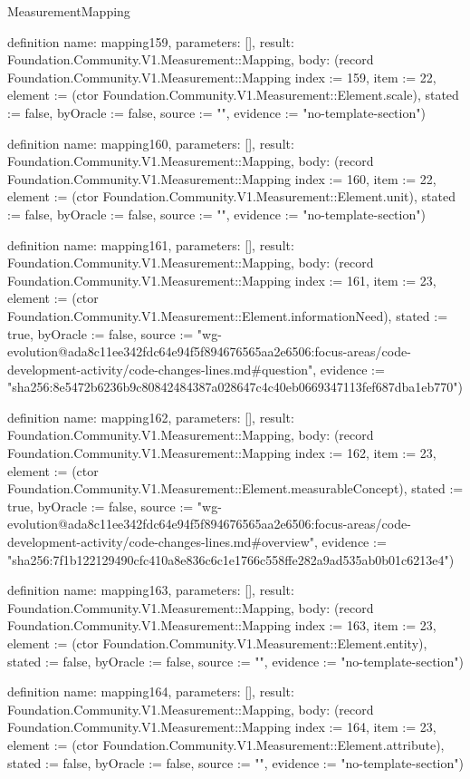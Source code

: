 \begin{lexlean}{MeasurementMapping}
\begin{semanticmodule}
definition{
  name: mapping159,
  parameters: [],
  result: Foundation.Community.V1.Measurement::Mapping,
  body: (record Foundation.Community.V1.Measurement::Mapping {index := 159, item := 22, element := (ctor Foundation.Community.V1.Measurement::Element.scale), stated := false, byOracle := false, source := "", evidence := "no-template-section"})
}

definition{
  name: mapping160,
  parameters: [],
  result: Foundation.Community.V1.Measurement::Mapping,
  body: (record Foundation.Community.V1.Measurement::Mapping {index := 160, item := 22, element := (ctor Foundation.Community.V1.Measurement::Element.unit), stated := false, byOracle := false, source := "", evidence := "no-template-section"})
}

definition{
  name: mapping161,
  parameters: [],
  result: Foundation.Community.V1.Measurement::Mapping,
  body: (record Foundation.Community.V1.Measurement::Mapping {index := 161, item := 23, element := (ctor Foundation.Community.V1.Measurement::Element.informationNeed), stated := true, byOracle := false, source := "wg-evolution@ada8c11ee342fdc64e94f5f894676565aa2e6506:focus-areas/code-development-activity/code-changes-lines.md#question", evidence := "sha256:8e5472b6236b9c80842484387a028647c4c40eb0669347113fef687dba1eb770"})
}

definition{
  name: mapping162,
  parameters: [],
  result: Foundation.Community.V1.Measurement::Mapping,
  body: (record Foundation.Community.V1.Measurement::Mapping {index := 162, item := 23, element := (ctor Foundation.Community.V1.Measurement::Element.measurableConcept), stated := true, byOracle := false, source := "wg-evolution@ada8c11ee342fdc64e94f5f894676565aa2e6506:focus-areas/code-development-activity/code-changes-lines.md#overview", evidence := "sha256:7f1b122129490cfc410a8e836c6c1e1766c558ffe282a9ad535ab0b01c6213e4"})
}

definition{
  name: mapping163,
  parameters: [],
  result: Foundation.Community.V1.Measurement::Mapping,
  body: (record Foundation.Community.V1.Measurement::Mapping {index := 163, item := 23, element := (ctor Foundation.Community.V1.Measurement::Element.entity), stated := false, byOracle := false, source := "", evidence := "no-template-section"})
}

definition{
  name: mapping164,
  parameters: [],
  result: Foundation.Community.V1.Measurement::Mapping,
  body: (record Foundation.Community.V1.Measurement::Mapping {index := 164, item := 23, element := (ctor Foundation.Community.V1.Measurement::Element.attribute), stated := false, byOracle := false, source := "", evidence := "no-template-section"})
}


\end{semanticmodule}
\end{lexlean}
